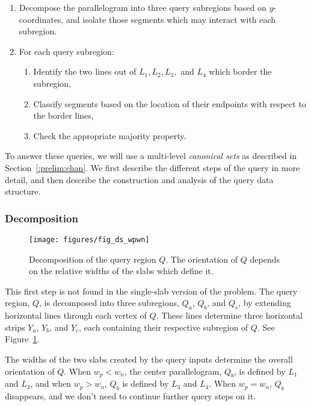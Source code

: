 \begin{enumerate}
 \item Decompose the parallelogram into three query subregions based on $y$-coordinates, and isolate those segments which may interact with each subregion.

 \item For each query subregion:
 \begin{enumerate}
  \item Identify the two lines out of $L_1, L_2, L_3,$ and $L_4$ which border the subregion,
  \item Classify segments based on the location of their endpoints with respect to the border lines,
  \item Check the appropriate majority property.
 \end{enumerate}
\end{enumerate}

To answer these queries, we will use a multi-level \emph{canonical sets} as described in Section~\ref{:prelim:chan}. We first describe the different steps of the query in more detail, and then describe the construction and analysis of the query data structure.


\subsubsection{Decomposition}

\begin{figure}
\begin{center}
  \texttt{[image: figures/fig\_ds\_wpwn]}
  \caption[Decomposition of the query region $Q$]{Decomposition of the query region $Q$. The orientation of $Q$ depends on the relative widths of the slabs which define it.}
  \label{fig:slabs:two:wpwn}
\end{center}
\end{figure}

This first step is not found in the single-slab version of the problem. The query region, $Q$, is decomposed into three subregions, $Q_a$, $Q_b$, and $Q_c$, by extending horizontal lines through each vertex of $Q$. These lines determine three horizontal strips $Y_a$, $Y_b$, and $Y_c$, each containing their respective subregion of $Q$. See Figure~\ref{fig:slabs:two:wpwn}.

The widths of the two slabs created by the query inputs determine the overall orientation of $Q$. When $w_p < w_n$, the center parallelogram, $Q_b$, is defined by $L_1$ and $L_2$, and when $w_p > w_n$, $Q_b$ is defined by $L_3$ and $L_4$. When $w_p = w_n$, $Q_b$ disappears, and we don't need to continue further query steps on it.

